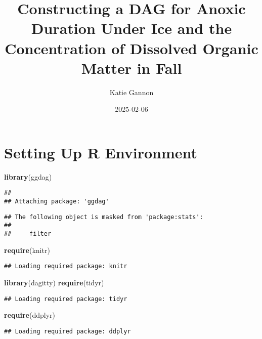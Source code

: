 \documentclass[
]{article}
\title{Constructing a DAG for Anoxic Duration Under Ice and the
Concentration of Dissolved Organic Matter in Fall}
\author{Katie Gannon}
\date{2025-02-06}
\newenvironment{Shaded}{\begin{snugshade}}{\end{snugshade}}
\newcommand{\FunctionTok}[1]{\textcolor[rgb]{0.13,0.29,0.53}{\textbf{#1}}}
\newcommand{\NormalTok}[1]{#1}
\begin{document}
\maketitle

\section{Setting Up R Environment}\label{setting-up-r-environment}

\begin{Shaded}
\begin{Highlighting}[]
\FunctionTok{library}\NormalTok{(ggdag)}
\end{Highlighting}
\end{Shaded}

\begin{verbatim}
## 
## Attaching package: 'ggdag'
\end{verbatim}

\begin{verbatim}
## The following object is masked from 'package:stats':
## 
##     filter
\end{verbatim}

\begin{Shaded}
\begin{Highlighting}[]
\FunctionTok{require}\NormalTok{(knitr)}
\end{Highlighting}
\end{Shaded}

\begin{verbatim}
## Loading required package: knitr
\end{verbatim}

\begin{Shaded}
\begin{Highlighting}[]
\FunctionTok{library}\NormalTok{(dagitty)}
\FunctionTok{require}\NormalTok{(tidyr)}
\end{Highlighting}
\end{Shaded}

\begin{verbatim}
## Loading required package: tidyr
\end{verbatim}

\begin{Shaded}
\begin{Highlighting}[]
\FunctionTok{require}\NormalTok{(ddplyr)}
\end{Highlighting}
\end{Shaded}

\begin{verbatim}
## Loading required package: ddplyr
\end{verbatim}
\end{document}
